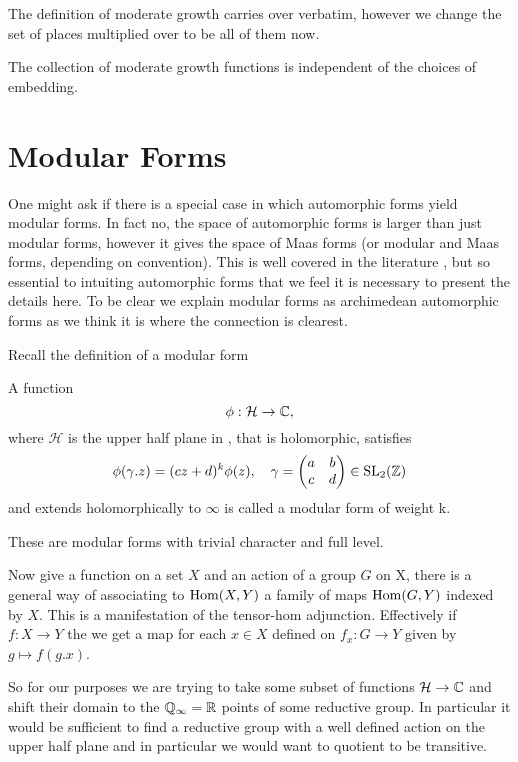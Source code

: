 	The definition of moderate growth carries over verbatim, however we change the set of places multiplied over to be all of them now.
    
    \begin{remark}
        The collection of moderate growth functions is independent of the choices of embedding. 
    \end{remark}

\section{Modular Forms}
One might ask if there is a special case in which automorphic forms yield modular forms. In fact no, the space of automorphic forms is larger than just modular forms, however it gives the space of Maas forms (or modular and Maas forms, depending on convention). This is well covered in the literature \cite{emertonCLASSICALMODULARFORMS}\cite[3.2]{bumpAutomorphicFormsRepresentations1997}\cite{booherVIEWINGMODULARFORMS}\cite{garrettTransitionEisensteinSeries2016}, but so essential to intuiting automorphic forms that we feel it is necessary to present the details here. To be clear we explain modular forms as archimedean automorphic forms as we think it is where the connection is clearest. 

	Recall the definition of a modular form 
	\begin{Definition}
		A function
		\[\phi: \mathcal{H} \to \C,\]
		where \(\mathcal{H}\) is the upper half plane in \C, that is holomorphic, satisfies 
		\[\phi(\gamma.z) = (cz+d)^k\phi(z), \quad \gamma = \begin{pmatrix}
			a &b \\
			c &d
		\end{pmatrix}\in \SL_2(\Z)\]
		and extends holomorphically to \(\infty\) is called a modular form of weight k.
	\end{Definition}
	These are modular forms with trivial character and full level.


	Now give a function on a set \(X\) and an action of a group \(G\) on X, there is a general way of associating to \(\operatorname{Hom}(X, Y)\) a family of maps \(\operatorname{Hom}(G, Y)\) indexed by \(X\). This is a manifestation of the tensor-hom adjunction. Effectively if \(f: X\to Y\) the we get a map for each \(x\in X\) defined on \(f_x : G \to Y\) given by \(g\mapsto f(g.x)\).

	So for our purposes we are trying to take some subset of functions \(\mathcal{H} \to \C\) and shift their domain to the \(\Q_\infty = \R\) points of some reductive group. In particular it would be sufficient to find a reductive group with a well defined action on the upper half plane and in particular we would want to quotient to be transitive.


